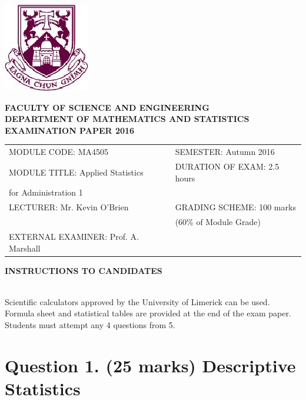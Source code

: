 \documentclass[a4paper,12pt]{article}
\begin{document}
\begin{center}
	\includegraphics[scale=0.65]{images/shieldtransparent2}
\end{center}

\begin{center}
	\vspace{1cm}
	\large \bf {FACULTY OF SCIENCE AND ENGINEERING} \\[0.5cm]
	\normalsize DEPARTMENT OF MATHEMATICS AND STATISTICS \\[1.25cm]
	\large \bf {EXAMINATION PAPER 2016} \\[1.5cm]
\end{center}

\begin{tabular}{ll}
	MODULE CODE: MA4505 & SEMESTER: Autumn 2016 \\[1cm]
	MODULE TITLE: Applied Statistics  & DURATION OF EXAM: 2.5 hours \\
\phantom{MODULE TITLE:} for Administration 1 & \phantom{ DURATION OF EXAM: 2.5 hours} \\[1cm]
	LECTURER: Mr. Kevin O'Brien & GRADING SCHEME: 100 marks \\
	& \phantom{GRADING S} \footnotesize {(60\% of Module Grade)} \\[0.8cm]
	EXTERNAL EXAMINER: Prof. A. Marshall & \\
\end{tabular}
\bigskip
\begin{center}
	{\bf INSTRUCTIONS TO CANDIDATES}
\end{center}

{\noindent \\ Scientific calculators approved by the University of Limerick can be used. \\
	Formula sheet and statistical tables are provided at the end of the exam paper.\\
	Students must attempt any 4 questions from 5.}
\newpage
\section*{Question 1. (25 marks) Descriptive Statistics}
\end{document}
